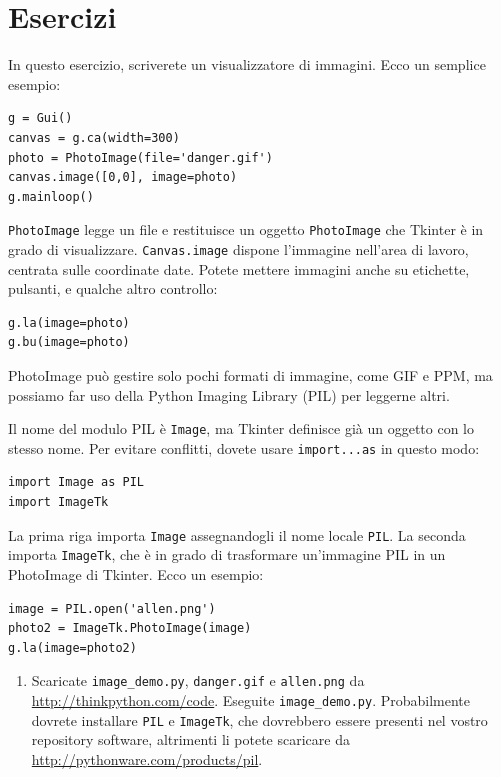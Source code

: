 \documentclass[10pt]{book}
\begin{document}
\section{Esercizi}

\begin{exercise}

In questo esercizio, scriverete un visualizzatore di immagini. Ecco un semplice esempio:

\begin{verbatim}
g = Gui()
canvas = g.ca(width=300)
photo = PhotoImage(file='danger.gif')
canvas.image([0,0], image=photo)
g.mainloop()
\end{verbatim}
%
{\tt PhotoImage} legge un file e restituisce un oggetto {\tt PhotoImage} che Tkinter è in grado di visualizzare.  {\tt Canvas.image} dispone l'immagine nell'area di lavoro, centrata sulle coordinate date. Potete mettere immagini anche su etichette, pulsanti, e qualche altro controllo:

\begin{verbatim}
g.la(image=photo)
g.bu(image=photo)
\end{verbatim}
%
PhotoImage può gestire solo pochi formati di immagine, come GIF e PPM, ma possiamo far uso della Python Imaging Library (PIL) per leggerne altri.

Il nome del modulo PIL è {\tt Image}, ma Tkinter definisce già un oggetto con lo stesso nome. Per evitare conflitti, dovete usare {\tt import...as} in questo modo:

\begin{verbatim}
import Image as PIL
import ImageTk
\end{verbatim}
%
La prima riga importa {\tt Image} assegnandogli il nome locale {\tt PIL}.  La seconda importa {\tt ImageTk}, che è in grado di trasformare un'immagine PIL in un PhotoImage di Tkinter. Ecco un esempio: 

\begin{verbatim}
image = PIL.open('allen.png')
photo2 = ImageTk.PhotoImage(image)
g.la(image=photo2)
\end{verbatim}
%

\begin{enumerate}

\item Scaricate \verb"image_demo.py", \verb"danger.gif" e \verb"allen.png"
da \url{http://thinkpython.com/code}.  Eseguite \verb"image_demo.py".  Probabilmente dovrete installare {\tt PIL} e {\tt ImageTk},  
che dovrebbero essere presenti nel vostro repository software, altrimenti li potete scaricare da \url{http://pythonware.com/products/pil}.


\end{enumerate}
\end{exercise}
\end{document}
